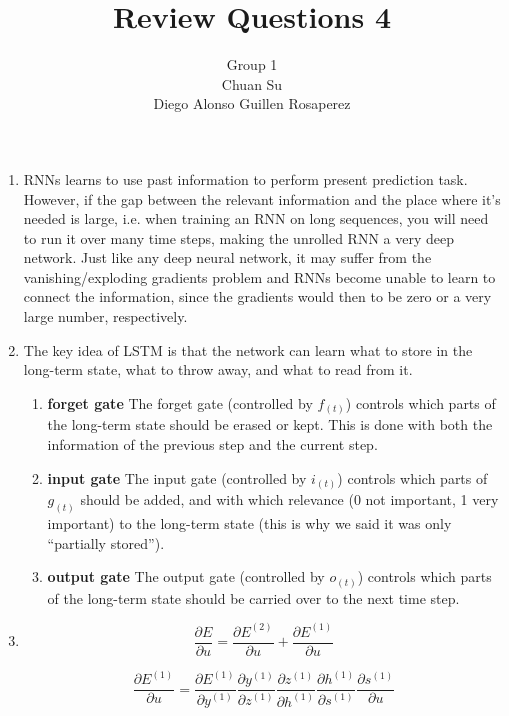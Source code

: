 \documentclass[12pt]{article}
\begin{document}
\title{Review Questions 4}
\author{Group 1 \\ Chuan Su \\ Diego Alonso Guillen Rosaperez}

\maketitle
\begin{enumerate}
\item RNNs learns to use past information to perform present prediction task. However, if the gap between the relevant information and the place where it's needed is large, i.e. when training an RNN on long sequences, you will need to run it over many time steps, making the unrolled RNN a very deep network. Just like any deep neural network, it may suffer from the vanishing/exploding gradients problem and RNNs become unable to learn to connect the information, since the gradients would then to be zero or a very large number, respectively.
\item  The key idea of LSTM is that the network can learn what to store in the long-term state, what to throw away, and what to read from it. 
\begin{enumerate}
\item \textbf{forget gate} The forget gate (controlled by $f_{(t)}$) controls which parts of the long-term state should be erased or kept. This is done with both the information of the previous step and the current step.
\item \textbf{input gate} The input gate (controlled by $i_{(t)}$) controls which parts of $g_{(t)}$ should be added, and with which relevance (0 not important, 1 very important) to the long-term state (this is why we said it was only “partially stored”).
\item \textbf{output gate} The output gate (controlled by $o_{(t)}$) controls which parts of the long-term state should be carried over to the next time step.
\end{enumerate}

\item 
\[\frac{\partial E}{\partial u} = \frac{\partial E^{(2)}}{\partial u} + \frac{\partial E^{(1)}}{\partial u}\]

\[\frac{\partial E^{(1)}}{\partial u} = \frac{\partial E^{(1)}}{\partial{y^{(1)}}} \frac{\partial y^{(1)}}{\partial z^{(1)}} \frac{\partial z^{(1)}}{\partial h^{(1)}} \frac{\partial h^{(1)}}{\partial s^{(1)}} \frac{\partial s^{(1)}}{\partial u}\]


\end{enumerate}
\end{document}
